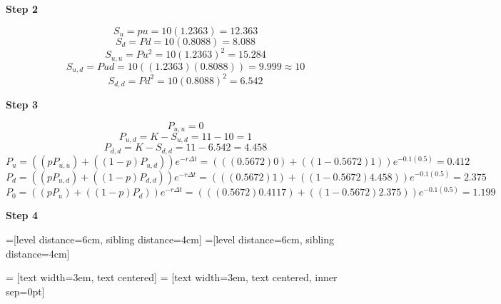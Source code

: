 \documentclass[11pt, english]{article}
\begin{document}
	\textbf{Step 2}

	$$S_u=pu=10(1.2363)=12.363$$
	$$S_d=Pd=10(0.8088)=8.088$$
	$$S_{u,u}=Pu^2=10(1.2363)^2=15.284$$
	$$S_{u,d}=Pud=10\left((1.2363)(0.8088)\right)=9.999\approx10$$
	$$S_{d,d}=Pd^2=10(0.8088)^2=6.542$$

	\textbf{Step 3}

	$$P_{u,u}=0$$
	$$P_{u,d}=K-S_{u,d}=11-10=1$$
	$$P_{d,d}=K-S_{d,d}=11-6.542=4.458$$
	$$P_u=\left((pP_{u,u})+\left((1-p)P_{u,d}\right)\right)e^{-r\Delta t}=\left(((0.5672)0)+((1-0.5672)1)\right)e^{-0.1(0.5)}=0.412$$
	$$P_d=\left((pP_{u,d})+\left((1-p)P_{d,d}\right)\right)e^{-r\Delta t}=\left(((0.5672)1)+((1-0.5672)4.458)\right)e^{-0.1(0.5)}=2.375$$
	$$P_0=\left((pP_u)+\left((1-p)P_d\right)\right)e^{-r\Delta t}=\left(((0.5672)0.4117)+((1-0.5672)2.375)\right)e^{-0.1(0.5)}=1.199$$

	\newpage

	\textbf{Step 4}

	=[level distance=6cm, sibling distance=4cm]
        =[level distance=6cm, sibling distance=4cm]

         = [text width=3em, text centered]
	 = [text width=3em, text centered, inner sep=0pt]

\end{document}
